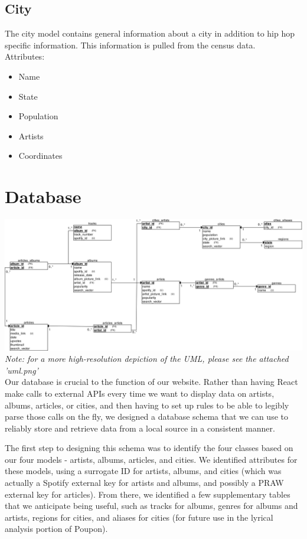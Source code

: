 \documentclass{scrartcl}
\begin{document}
    \subsection{City}\label{subsec:city}
    The city model contains general information about a city in addition to hip hop specific information.
    This information is pulled from the census data.\\

    Attributes:
    \begin{itemize}
        \item Name
        \item State
        \item Population
        \item Artists
        \item Coordinates
    \end{itemize}

    \section{Database}\label{sec:database}
    \includegraphics[width=1\textwidth]{uml}
    \textit{Note: for a more high-resolution depiction of the UML, please see the attached 'uml.png'}\\

    Our database is crucial to the function of our website.
    Rather than having React make calls to external APIs every time we want to display data on artists, albums, articles, or cities, and then having to set up rules to be able to legibly parse those calls on the fly, we designed a database schema that we can use to reliably store and retrieve data from a local source in a consistent manner.

    \newpage
    The first step to designing this schema was to identify the four classes based on our four models - artists, albums, articles, and cities.
    We identified attributes for these models, using a surrogate ID for artists, albums, and cities (which was actually a Spotify external key for artists and albums, and possibly a PRAW external key for articles).
    From there, we identified a few supplementary tables that we anticipate being useful, such as tracks for albums, genres for albums and artists, regions for cities, and aliases for cities (for future use in the lyrical analysis portion of Poupon).
\end{document}
